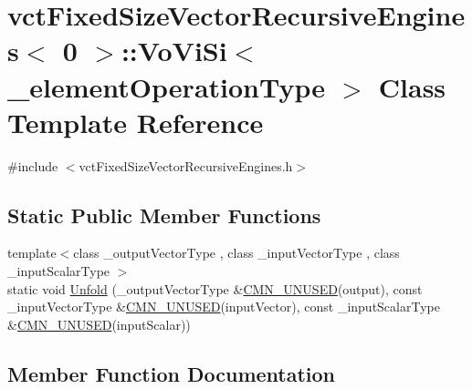 \hypertarget{classvct_fixed_size_vector_recursive_engines_3_010_01_4_1_1_vo_vi_si}{}\section{vct\+Fixed\+Size\+Vector\+Recursive\+Engines$<$ 0 $>$\+:\+:Vo\+Vi\+Si$<$ \+\_\+element\+Operation\+Type $>$ Class Template Reference}
\label{classvct_fixed_size_vector_recursive_engines_3_010_01_4_1_1_vo_vi_si}


{\ttfamily \#include $<$vct\+Fixed\+Size\+Vector\+Recursive\+Engines.\+h$>$}

\subsection*{Static Public Member Functions}
\begin{DoxyCompactItemize}
\item 
{\footnotesize template$<$class \+\_\+output\+Vector\+Type , class \+\_\+input\+Vector\+Type , class \+\_\+input\+Scalar\+Type $>$ }\\static void \hyperlink{classvct_fixed_size_vector_recursive_engines_3_010_01_4_1_1_vo_vi_si_a67c80d760b93058f9ce0f6b40ce15b80}{Unfold} (\+\_\+output\+Vector\+Type \&\hyperlink{cmn_portability_8h_a021894e2626935fa2305434b1e893ff6}{C\+M\+N\+\_\+\+U\+N\+U\+S\+E\+D}(output), const \+\_\+input\+Vector\+Type \&\hyperlink{cmn_portability_8h_a021894e2626935fa2305434b1e893ff6}{C\+M\+N\+\_\+\+U\+N\+U\+S\+E\+D}(input\+Vector), const \+\_\+input\+Scalar\+Type \&\hyperlink{cmn_portability_8h_a021894e2626935fa2305434b1e893ff6}{C\+M\+N\+\_\+\+U\+N\+U\+S\+E\+D}(input\+Scalar))
\end{DoxyCompactItemize}


\subsection{Member Function Documentation}
\hypertarget{classvct_fixed_size_vector_recursive_engines_3_010_01_4_1_1_vo_vi_si_a67c80d760b93058f9ce0f6b40ce15b80}{}
